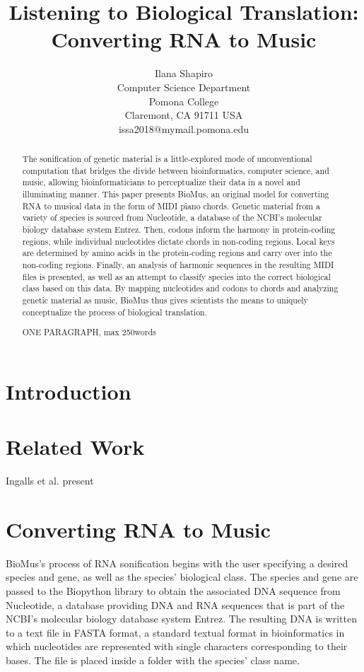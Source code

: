 \documentclass[letterpaper]{article}
\title{Listening to Biological Translation: Converting RNA to Music}
\author{Ilana Shapiro\\
Computer Science Department\\
Pomona College\\
Claremont, CA 91711 USA\\
issa2018@mymail.pomona.edu\\
}
\begin{document}
 
\maketitle
\begin{abstract}
The sonification of genetic material is a little-explored mode of unconventional computation that bridges the divide between bioinformatics, computer science, and music, allowing bioinformaticians to perceptualize their data in a novel and illuminating manner. This paper presents BioMus, an original model for converting RNA to musical data in the form of MIDI piano chords. Genetic material from a variety of species is sourced from Nucleotide, a database of the NCBI's molecular biology database system Entrez. Then, codons inform the harmony in protein-coding regions, while individual nucleotides dictate chords in non-coding regions. Local keys are determined by amino acids in the protein-coding regions and carry over into the non-coding regions. Finally, an analysis of harmonic sequences in the resulting MIDI files is presented, as well as an attempt to classify species into the correct biological class based on this data. By mapping nucleotides and codons to chords and analyzing genetic material as music, BioMus thus gives scientists the means to uniquely conceptualize the process of biological translation.

ONE PARAGRAPH, max 250words
\end{abstract}

\section{Introduction}

\section{Related Work}

Ingalls et al. present 

\section{Converting RNA to Music}
BioMus's process of RNA sonification begins with the user specifying a desired species and gene, as well as the species' biological class. The species and gene are passed to the Biopython library to obtain the associated DNA sequence from Nucleotide, a database providing DNA and RNA sequences that is part of the NCBI's molecular biology database system Entrez. The resulting DNA is written to a text file in FASTA format, a standard textual format in bioinformatics in which nucleotides are represented with single characters corresponding to their bases. The file is placed inside a folder with the species' class name.
\end{document}
